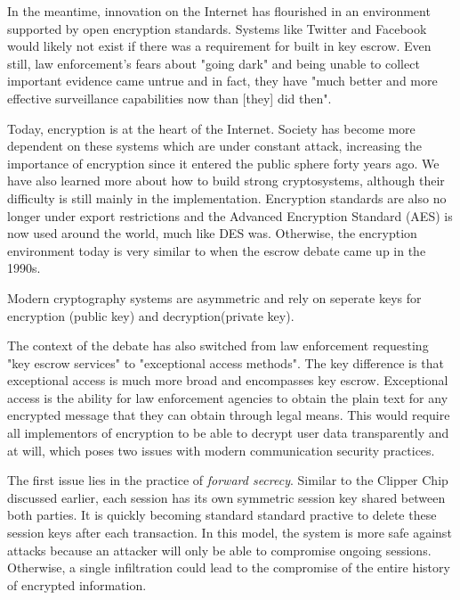 \documentclass[12pt]{turabian-researchpaper}
\begin{document}
In the meantime, innovation on the Internet has flourished in an environment supported by open encryption standards.
Systems like Twitter and Facebook would likely not exist if there was a requirement for built in key escrow.
Even still, law enforcement's fears about "going dark" and being unable to collect important evidence came untrue and in fact, they have "much better and more effective surveillance capabilities now than [they] did then".

Today, encryption is at the heart of the Internet.
Society has become more dependent on these systems which are under constant attack, increasing the importance of encryption since it entered the public sphere forty years ago.
We have also learned more about how to build strong cryptosystems, although their difficulty is still mainly in the implementation.
Encryption standards are also no longer under export restrictions and the Advanced Encryption Standard (AES) is now used around the world, much like DES was.
Otherwise, the encryption environment today is very similar to when the escrow debate came up in the 1990s.

Modern cryptography systems are asymmetric and rely on seperate keys for encryption (public key) and decryption(private key).

The context of the debate has also switched from law enforcement requesting "key escrow services" to "exceptional access methods".
The key difference is that exceptional access is much more broad and encompasses key escrow.
Exceptional access is the ability for law enforcement agencies to obtain the plain text for any encrypted message that they can obtain through legal means.
This would require all implementors of encryption to be able to decrypt user data transparently and at will, which poses two issues with modern communication security practices.

The first issue lies in the practice of \textit{forward secrecy}.
Similar to the Clipper Chip discussed earlier, each session has its own symmetric session key shared between both parties.
It is quickly becoming standard standard practive to delete these session keys after each transaction.
In this model, the system is more safe against attacks because an attacker will only be able to compromise ongoing sessions.
Otherwise, a single infiltration could lead to the compromise of the entire history of encrypted information.
\end{document}
